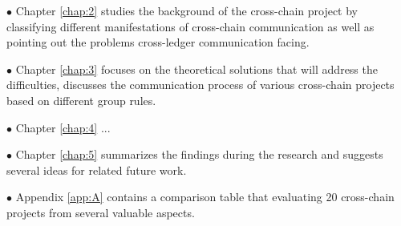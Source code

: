 $\bullet $ Chapter \ref{chap:2} studies the background of the cross-chain project by classifying different manifestations of cross-chain communication as well as pointing out the problems cross-ledger communication facing.

$\bullet $ Chapter \ref{chap:3} focuses on the theoretical solutions that will address the difficulties, discusses the communication process of various cross-chain projects based on different group rules. 

$\bullet $ Chapter \ref{chap:4} ...

$\bullet $ Chapter \ref{chap:5} summarizes the findings during the research and suggests several ideas for related future work.

$\bullet $ Appendix \ref{app:A} contains a comparison table that evaluating 20 cross-chain projects from several valuable aspects.